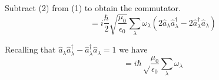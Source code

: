 Subtract (2) from (1) to obtain the commutator.
\begin{equation*}
[\hat E_x,\hat B_y]
=i\frac{\hbar}{2}\sqrt{\frac{\mu_0}{\epsilon_0}}\sum_\lambda\omega_\lambda
\left(2\hat a_\lambda\hat a_\lambda^\dag-2\hat a_\lambda^\dag\hat a_\lambda\right)
\end{equation*}

Recalling that $\hat a_\lambda\hat a_\lambda^\dag-\hat a_\lambda^\dag\hat a_\lambda=1$ we have
\begin{equation*}
[\hat E_x,\hat B_y]
=i\hbar\sqrt\frac{\mu_0}{\epsilon_0}\sum_\lambda\omega_\lambda
\end{equation*}


